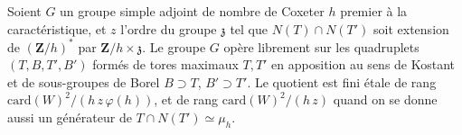 \begin{encadre}
\begin{theoreme*}\nonverifie
Soient $G$ un groupe simple adjoint de nombre de Coxeter $h$ premier à la caractéristique, et $z$ l'ordre du groupe $\mathfrak z$ tel que $N(T) \cap N(T')$ soit extension de $(\mathbf Z/h)^*$ par $\mathbf Z/h \times \mathfrak z$. Le groupe $G$ opère librement sur les quadruplets $(T, B, T', B')$ formés de tores maximaux $T, T'$ en apposition au sens de Kostant et de sous-groupes de Borel $B \supset T$, $B' \supset T'$. Le quotient est fini étale de rang $\mathrm{card}(W)^2/(h\,z\,\varphi(h))$, et de rang $\mathrm{card}(W)^2/(h\,z)$ quand on se donne aussi un générateur de $T \cap N(T') \simeq \mu_h$.
\end{theoreme*}
\end{encadre}
